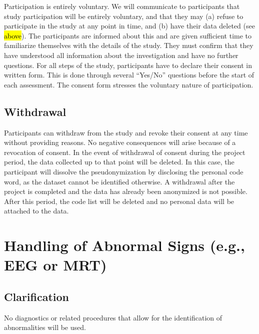 \documentclass[11pt,twoside,a4paper]{article}
\begin{document}
Participation is entirely voluntary.
We will communicate to participants that study participation will be entirely voluntary, and that they may (a) refuse to participate in the study at any point in time, and (b) have their data deleted (see \hl{above}).
The participants are informed about this and are given sufficient time to familiarize themselves with the details of the study.
They must confirm that they have understood all information about the investigation and have no further questions.
For all steps of the study, participants have to declare their consent in written form.
This is done through several ``Yes/No'' questions before the start of each assessment.
The consent form stresses the voluntary nature of participation.

\subsection{Withdrawal}


Participants can withdraw from the study and revoke their consent at any time without providing reasons.
No negative consequences will arise because of a revocation of consent.
In the event of withdrawal of consent during the project period, the data collected up to that point will be deleted.
In this case, the participant will dissolve the pseudonymization by disclosing the personal code word, as the dataset cannot be identified otherwise.
A withdrawal after the project is completed and the data has already been anonymized is not possible.
After this period, the code list will be deleted and no personal data will be attached to the data.

\section{Handling of Abnormal Signs (e.g., EEG or MRT)}

\subsection{Clarification}


No diagnostics or related procedures that allow for the identification of abnormalities will be used.
\end{document}
